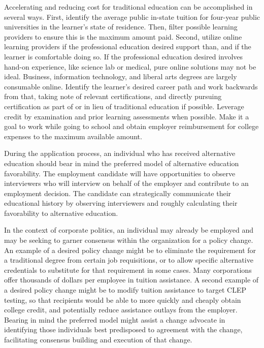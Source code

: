 \documentclass[AER]{/Users/zyl357/Documents/GitHub/research-dissertation-case-for-alt-ed/papers/alt-ed-survey/aea-latex-templates/AEA}
\begin{document}
Accelerating and reducing cost for traditional education can be
accomplished in several ways. First, identify the average public in-state
tuition for four-year public universities in the learner’s state of
residence. Then, filter possible learning providers to ensure this is the
maximum amount paid. Second, utilize online learning providers if the
professional education desired support than, and if the learner is
comfortable doing so. If the professional education desired involves
hand-on experience, like science lab or medical, pure online solutions may
not be ideal. Business, information technology, and liberal arts degrees
are largely consumable online. Identify the learner’s desired career path
and work backwards from that, taking note of relevant certifications, and
directly pursuing certification as part of or in lieu of traditional
education if possible. Leverage credit by examination and prior learning
assessments when possible. Make it a goal to work while going to school
and obtain employer reimbursement for college expenses to the maximum
available amount.

During the application process, an individual who has received alternative
education should bear in mind the preferred model of alternative education
favorability. The employment candidate will have opportunities to observe
interviewers who will interview on behalf of the employer and contribute
to an employment decision. The candidate can strategically communicate
their educational history by observing interviewers and roughly
calculating their favorability to alternative education.

In the context of corporate politics, an individual may already be
employed and may be seeking to garner consensus within the organization
for a policy change. An example of a desired policy change might be to
eliminate the requirement for a traditional degree from certain job
requisitions, or to allow specific alternative credentials to substitute
for that requirement in some cases. Many corporations offer thousands of
dollars per employee in tuition assistance. A second example of a desired
policy change might be to modify tuition assistance to target CLEP
testing, so that recipients would be able to more quickly and cheaply
obtain college credit, and potentially reduce assistance outlays from the
employer. Bearing in mind the preferred model might assist a change
advocate in identifying those individuals best predisposed to agreement
with the change, facilitating consensus building and execution of that
change.
\end{document}
